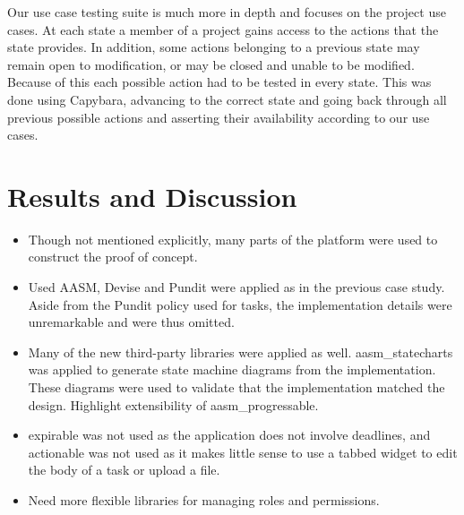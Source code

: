 \documentclass[document.tex]{subfiles}
\begin{document}
Our use case testing suite is much more in depth and focuses on the project use cases. At each state a member of a project gains access to the actions that the state provides. In addition, some actions belonging to a previous state may remain open to modification, or may be closed and unable to be modified. Because of this each possible action had to be tested in every state. This was done using Capybara, advancing to the correct state and going back through all previous possible actions and asserting their availability according to our use cases.


\section {Results and Discussion}


\begin{itemize}
\item Though not mentioned explicitly, many parts of the platform were used to construct the proof of concept.
\item Used AASM, Devise and Pundit were applied as in the previous case study. Aside from the Pundit policy used for tasks, the implementation details were unremarkable and were thus omitted.
\item Many of the new third-party libraries were applied as well. aasm\_statecharts was applied to generate state machine diagrams from the implementation. These diagrams were used to validate that the implementation matched the design. Highlight extensibility of aasm\_progressable.
\item expirable was not used as the application does not involve deadlines, and actionable was not used as it makes little sense to use a tabbed widget to edit the body of a task or upload a file.
\item Need more flexible libraries for managing roles and permissions.
\end{itemize}
\end{document}
